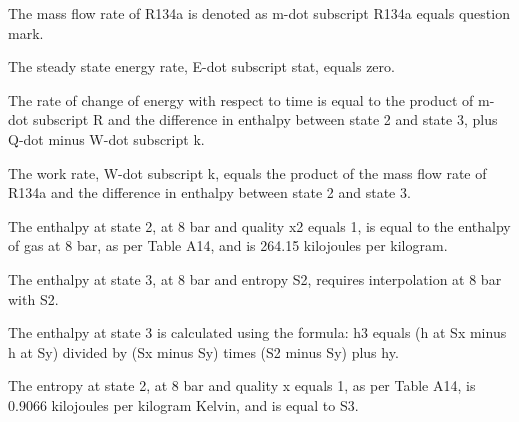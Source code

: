 The mass flow rate of R134a is denoted as m-dot subscript R134a equals question mark.

The steady state energy rate, E-dot subscript stat, equals zero.

The rate of change of energy with respect to time is equal to the product of m-dot subscript R and the difference in enthalpy between state 2 and state 3, plus Q-dot minus W-dot subscript k.

The work rate, W-dot subscript k, equals the product of the mass flow rate of R134a and the difference in enthalpy between state 2 and state 3.

The enthalpy at state 2, at 8 bar and quality x2 equals 1, is equal to the enthalpy of gas at 8 bar, as per Table A14, and is 264.15 kilojoules per kilogram.

The enthalpy at state 3, at 8 bar and entropy S2, requires interpolation at 8 bar with S2.

The enthalpy at state 3 is calculated using the formula: h3 equals (h at Sx minus h at Sy) divided by (Sx minus Sy) times (S2 minus Sy) plus hy.

The entropy at state 2, at 8 bar and quality x equals 1, as per Table A14, is 0.9066 kilojoules per kilogram Kelvin, and is equal to S3.